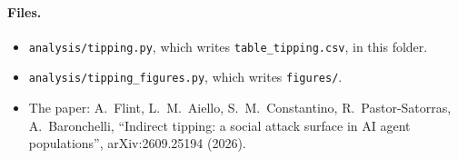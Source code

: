 \documentclass[10pt,a4paper]{article}
\begin{document}
\paragraph{Files.}
\begin{itemize}
\item \nolinkurl{analysis/tipping.py}, which writes \nolinkurl{table_tipping.csv}, in this folder.
\item \nolinkurl{analysis/tipping_figures.py}, which writes \nolinkurl{figures/}.
\item The paper: A.~Flint, L.~M.~Aiello, S.~M.~Constantino, R.~Pastor-Satorras, A.~Baronchelli, ``Indirect tipping: a
  social attack surface in AI agent populations'', arXiv:2609.25194 (2026).
\end{itemize}
\end{document}
